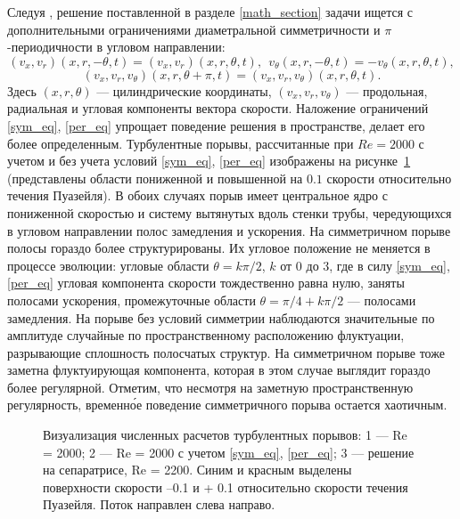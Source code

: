 Следуя \cite{Avila2013}, решение поставленной в разделе \ref{math_section} задачи ищется с дополнительными ограничениями диаметральной симметричности и $\pi$-периодичности в угловом направлении:
\begin{equation}\label{sym_eq}
(v_x,v_r)(x,r,-\theta,t)=(v_x,v_r)(x,r,\theta,t),\ \ v_\theta(x,r,-\theta,t)=-v_\theta(x,r,\theta,t),
\end{equation}
\begin{equation}\label{per_eq}
(v_x,v_r,v_\theta)(x,r,\theta+\pi,t) = (v_x,v_r,v_\theta)(x,r,\theta,t).
\end{equation}
Здесь $(x, r, \theta)$ --- цилиндрические координаты, $(v_x, v_r, v_\theta)$ --- продольная, радиальная и угловая компоненты вектора скорости. Наложение ограничений \eqref{sym_eq}, \eqref{per_eq} упрощает поведение решения в пространстве, делает его более определенным. Турбулентные порывы, рассчитанные при $Re=2000$ с учетом и без учета условий \eqref{sym_eq}, \eqref{per_eq} изображены на рисунке~\ref{3D_img} (представлены области пониженной и повышенной на $0.1$ скорости относительно течения Пуазейля). В обоих случаях порыв имеет центральное ядро с пониженной скоростью и систему вытянутых вдоль стенки трубы, чередующихся в угловом направлении полос замедления и ускорения. На симметричном порыве полосы гораздо более структурированы. Их угловое положение не меняется в процессе эволюции: угловые области $\theta=k\pi/2$, $k$ от $0$ до $3$, где в силу \eqref{sym_eq}, \eqref{per_eq} угловая компонента скорости тождественно равна нулю, заняты полосами ускорения, промежуточные области $\theta=\pi/4+k\pi/2$ --- полосами замедления. На порыве без условий симметрии наблюдаются значительные по амплитуде случайные по пространственному расположению флуктуации, разрывающие сплошность полосчатых структур. На симметричном порыве тоже заметна флуктуирующая компонента, которая в этом случае выглядит гораздо более регулярной. Отметим, что несмотря на заметную пространственную регулярность, временн\'{о}е поведение симметричного порыва остается хаотичным.


\begin{figure}[h]
\caption{Визуализация численных расчетов турбулентных порывов: 1 --- Re = 2000; 2 --- Re = 2000 с учетом \eqref{sym_eq}, \eqref{per_eq}; 3 --- решение на сепаратрисе, Re = 2200. Синим и красным выделены поверхности скорости –0.1 и + 0.1 относительно скорости течения Пуазейля. Поток направлен слева направо.}
\label{3D_img}
\end{figure}

